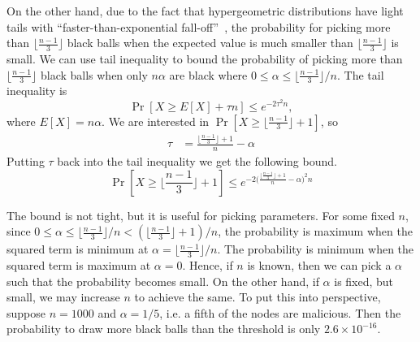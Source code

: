 On the other hand, due to the fact that hypergeometric distributions have light tails with ``faster-than-exponential fall-off''~\cite{skala2013hypergeometric},
the probability for picking more than $\lfloor \frac{n-1}{3} \rfloor$ black balls when 
the expected value is much smaller than $\lfloor \frac{n-1}{3} \rfloor$ is small.
We can use tail inequality to bound the probability of picking more than $\lfloor \frac{n-1}{3} \rfloor$ black balls when only $n\alpha$ are black where $0 \le \alpha \le \lfloor \frac{n-1}{3} \rfloor / n$.
The tail inequality is
$$
\Pr[X \ge E[X] + \tau n] \le e^{-2\tau^2n},
$$
where $E[X] = n\alpha$.
We are interested in $\Pr[X \ge \lfloor \frac{n-1}{3} \rfloor + 1]$, so
\begin{align*}
\tau &= \frac{\lfloor \frac{n-1}{3} \rfloor + 1}{n} - \alpha
\end{align*}
Putting $\tau$ back into the tail inequality we get the following bound.
$$
\Pr[X \ge \lfloor \frac{n-1}{3} \rfloor + 1] \le e^{-2 \big(\frac{\lfloor  \frac{n - 1}{3} \rfloor + 1}{n} - \alpha \big)^2 n}
$$

The bound is not tight, but it is useful for picking parameters.
For some fixed $n$, since $0 \le \alpha \le \lfloor \frac{n-1}{3} \rfloor/n < (\lfloor  \frac{n - 1}{3} \rfloor + 1) / n$,
the probability is maximum when the squared term is minimum at $\alpha = \lfloor \frac{n-1}{3} \rfloor/n$.
The probability is minimum when the squared term is maximum at $\alpha = 0$.
Hence, if $n$ is known, then we can pick a $\alpha$ such that the probability becomes small.
On the other hand, if $\alpha$ is fixed, but small, we may increase $n$ to achieve the same.
To put this into perspective,
suppose $n = 1000$ and $\alpha = 1/5$, i.e. a fifth of the nodes are malicious.
Then the probability to draw more black balls than the threshold is only $2.6 \times 10^{-16}$.
